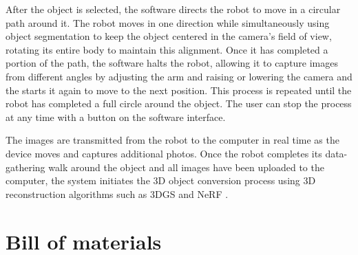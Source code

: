 \documentclass{article}
\begin{document}
After the object is selected, the software directs the robot to move in a circular path around it. The robot moves in one direction while simultaneously using object segmentation to keep the object centered in the camera's field of view, rotating its entire body to maintain this alignment. Once it has completed a portion of the path, the software halts the robot, allowing it to capture images from different angles by adjusting the arm and raising or lowering the camera and the starts it again to move to the next position. This process is repeated until the robot has completed a full circle around the object. The user can stop the process at any time with a button on the software interface.

The images are transmitted from the robot to the computer in real time as the device moves and captures additional photos. Once the robot completes its data-gathering walk around the object and all images have been uploaded to the computer, the system initiates the 3D object conversion process using 3D reconstruction algorithms such as 3DGS \cite{kerbl3Dgaussians} and NeRF \cite{mildenhall2020nerf}.

\newpage
\section{Bill of materials}
\end{document}
